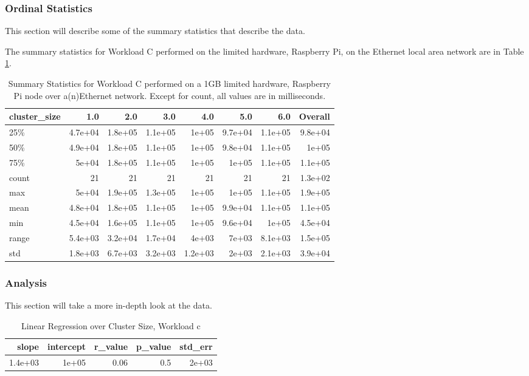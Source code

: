 \subsubsection{Ordinal Statistics}
This section will describe some of the summary statistics that describe the data.  

The summary statistics for Workload C performed on the limited hardware, Raspberry Pi, on the Ethernet local area network are in Table \ref{table:summary_table_c_1GB_rp_eth}.
\begin{table}
\begin{tabular}{lrrrrrrr}
\toprule
cluster\_size &     1.0 &     2.0 &     3.0 &     4.0 &     5.0 &     6.0 &  Overall \\
\midrule
25\%   & 4.7e+04 & 1.8e+05 & 1.1e+05 &   1e+05 & 9.7e+04 & 1.1e+05 &  9.8e+04 \\
50\%   & 4.9e+04 & 1.8e+05 & 1.1e+05 &   1e+05 & 9.8e+04 & 1.1e+05 &    1e+05 \\
75\%   &   5e+04 & 1.8e+05 & 1.1e+05 &   1e+05 &   1e+05 & 1.1e+05 &  1.1e+05 \\
count &      21 &      21 &      21 &      21 &      21 &      21 &  1.3e+02 \\
max   &   5e+04 & 1.9e+05 & 1.3e+05 &   1e+05 &   1e+05 & 1.1e+05 &  1.9e+05 \\
mean  & 4.8e+04 & 1.8e+05 & 1.1e+05 &   1e+05 & 9.9e+04 & 1.1e+05 &  1.1e+05 \\
min   & 4.5e+04 & 1.6e+05 & 1.1e+05 &   1e+05 & 9.6e+04 &   1e+05 &  4.5e+04 \\
range & 5.4e+03 & 3.2e+04 & 1.7e+04 &   4e+03 &   7e+03 & 8.1e+03 &  1.5e+05 \\
std   & 1.8e+03 & 6.7e+03 & 3.2e+03 & 1.2e+03 &   2e+03 & 2.1e+03 &  3.9e+04 \\
\bottomrule
\end{tabular}
\caption{Summary Statistics for Workload C performed on a 1GB limited hardware, Raspberry Pi node over a(n)Ethernet network.  Except for count, all values are in milliseconds.}
\label{table:summary_table_c_1GB_rp_eth}
\end{table}



\subsubsection{Analysis}
This section will take a more in-depth look at the data.


\begin{table}[H]
\centering
\begin{tabular}{rrrrr}
\toprule
  slope &  intercept &  r\_value &  p\_value &  std\_err \\
\midrule
1.4e+03 &      1e+05 &     0.06 &      0.5 &    2e+03 \\
\bottomrule
\end{tabular}
\caption{Linear Regression over Cluster Size, Workload c}
\label{table:rp_only_c}
\end{table}




